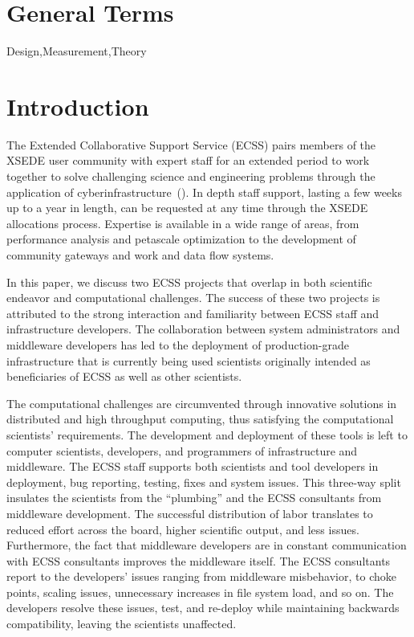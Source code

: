 \documentclass{sig-alternate}
\begin{document}

\section*{General Terms}{Design,Measurement,Theory}

 \keywords{}

\section{Introduction}

The Extended Collaborative Support Service (ECSS) pairs members of the XSEDE
user community with expert staff for an extended period to work together to
solve challenging science and engineering problems through the application of
cyberinfrastructure~(\cite{ECSS_webpage}). In depth staff support, lasting a few
weeks up to a year in length, can be requested at any time through the XSEDE
allocations process. Expertise is available in a wide range of areas, from
performance analysis and petascale optimization to the development of community
gateways and work and data flow systems.

In this paper, we discuss two ECSS projects that overlap in both
scientific endeavor and computational challenges. The success of these
two projects is attributed to the strong interaction and familiarity
between ECSS staff and infrastructure developers. The collaboration
between system administrators and middleware developers has led to the
deployment of production-grade infrastructure that is currently being
used scientists originally intended as beneficiaries of ECSS as well
as other scientists.

The computational challenges are circumvented through innovative solutions in
distributed and high throughput computing, thus satisfying the computational
scientists' requirements. The development and deployment of these tools is left
to computer scientists, developers, and programmers of infrastructure and
middleware. The ECSS staff supports both scientists and tool developers in
deployment, bug reporting, testing, fixes and system issues. This three-way
split insulates the scientists from the ``plumbing'' and the ECSS consultants
from middleware development. The successful distribution of labor translates
to reduced effort across the board, higher scientific output, and less issues.
Furthermore, the fact that middleware developers are in constant communication
with ECSS consultants improves the middleware itself. The ECSS consultants
report to the developers' issues ranging from middleware misbehavior,
to choke points, scaling issues, unnecessary increases in file system load, and so
on. The developers resolve these issues, test, and re-deploy while maintaining
backwards compatibility, leaving the scientists unaffected.
\end{document}
